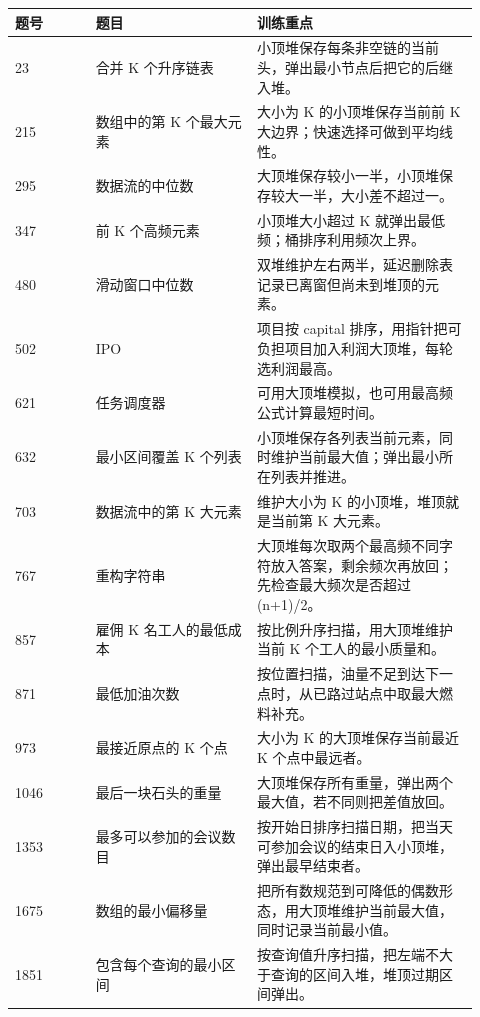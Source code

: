 \begin{longtable}{@{}p{0.16\linewidth}p{0.32\linewidth}p{0.44\linewidth}@{}}
\toprule
题号 & 题目 & 训练重点\\
\midrule
\endhead
23 & 合并 K 个升序链表 & 小顶堆保存每条非空链的当前头，弹出最小节点后把它的后继入堆。\\
215 & 数组中的第 K 个最大元素 & 大小为 K 的小顶堆保存当前前 K 大边界；快速选择可做到平均线性。\\
295 & 数据流的中位数 & 大顶堆保存较小一半，小顶堆保存较大一半，大小差不超过一。\\
347 & 前 K 个高频元素 & 小顶堆大小超过 K 就弹出最低频；桶排序利用频次上界。\\
480 & 滑动窗口中位数 & 双堆维护左右两半，延迟删除表记录已离窗但尚未到堆顶的元素。\\
502 & IPO & 项目按 capital 排序，用指针把可负担项目加入利润大顶堆，每轮选利润最高。\\
621 & 任务调度器 & 可用大顶堆模拟，也可用最高频公式计算最短时间。\\
632 & 最小区间覆盖 K 个列表 & 小顶堆保存各列表当前元素，同时维护当前最大值；弹出最小所在列表并推进。\\
703 & 数据流中的第 K 大元素 & 维护大小为 K 的小顶堆，堆顶就是当前第 K 大元素。\\
767 & 重构字符串 & 大顶堆每次取两个最高频不同字符放入答案，剩余频次再放回；先检查最大频次是否超过 (n+1)/2。\\
857 & 雇佣 K 名工人的最低成本 & 按比例升序扫描，用大顶堆维护当前 K 个工人的最小质量和。\\
871 & 最低加油次数 & 按位置扫描，油量不足到达下一点时，从已路过站点中取最大燃料补充。\\
973 & 最接近原点的 K 个点 & 大小为 K 的大顶堆保存当前最近 K 个点中最远者。\\
1046 & 最后一块石头的重量 & 大顶堆保存所有重量，弹出两个最大值，若不同则把差值放回。\\
1353 & 最多可以参加的会议数目 & 按开始日排序扫描日期，把当天可参加会议的结束日入小顶堆，弹出最早结束者。\\
1675 & 数组的最小偏移量 & 把所有数规范到可降低的偶数形态，用大顶堆维护当前最大值，同时记录当前最小值。\\
1851 & 包含每个查询的最小区间 & 按查询值升序扫描，把左端不大于查询的区间入堆，堆顶过期区间弹出。\\
\bottomrule
\end{longtable}


